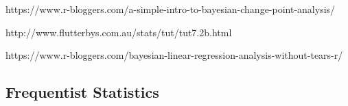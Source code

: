 \documentclass{article}\usepackage[]{graphicx}\usepackage[]{color}
\begin{document}



https://www.r-bloggers.com/a-simple-intro-to-bayesian-change-point-analysis/
	
http://www.flutterbys.com.au/stats/tut/tut7.2b.html

https://www.r-bloggers.com/bayesian-linear-regression-analysis-without-tears-r/
    
\subsection{Frequentist Statistics}

\end{document}
